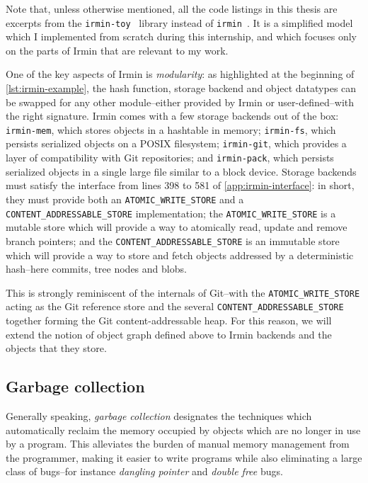 

Note that, unless otherwise mentioned, all the code listings in this thesis are excerpts from the \texttt{irmin-toy}~\cite{irmin-toy-github} library instead of \texttt{irmin}~\cite{irmin-github}. It is a simplified model which I implemented from scratch during this internship, and which focuses only on the parts of Irmin that are relevant to my work.

\bigskip
One of the key aspects of Irmin is \emph{modularity}: as highlighted at the beginning of \cref{lst:irmin-example}, the hash function, storage backend and object datatypes can be swapped for any other module--either provided by Irmin or user-defined--with the right signature. Irmin comes with a few storage backends out of the box: \texttt{irmin-mem}, which stores objects in a hashtable in memory; \texttt{irmin-fs}, which persists serialized objects on a POSIX filesystem; \texttt{irmin-git}, which provides a layer of compatibility with Git repositories; and \texttt{irmin-pack}, which persists serialized objects in a single large file similar to a block device. Storage backends must satisfy the interface from lines 398 to 581 of \cref{app:irmin-interface}: in short, they must provide both an \texttt{ATOMIC\_WRITE\_STORE} and a \texttt{CONTENT\_ADDRESSABLE\_STORE} implementation; the \texttt{ATOMIC\_WRITE\_STORE} is a mutable store which will provide a way to atomically read, update and remove branch pointers; and the \texttt{CONTENT\_ADDRESSABLE\_STORE} is an immutable store which will provide a way to store and fetch objects addressed by a deterministic hash--here commits, tree nodes and blobs.

\bigskip
This is strongly reminiscent of the internals of Git--with the \texttt{ATOMIC\_WRITE\_STORE} acting as the Git reference store and the several \texttt{CONTENT\_ADDRESSABLE\_STORE} together forming the Git content-addressable heap. For this reason, we will extend the notion of object graph defined above to Irmin backends and the objects that they store.

\subsection{Garbage collection}

Generally speaking, \emph{garbage collection} designates the techniques which automatically reclaim the memory occupied by objects which are no longer in use by a program. This alleviates the burden of manual memory management from the programmer, making it easier to write programs while also eliminating a large class of bugs--for instance \emph{dangling pointer} and \emph{double free} bugs.

